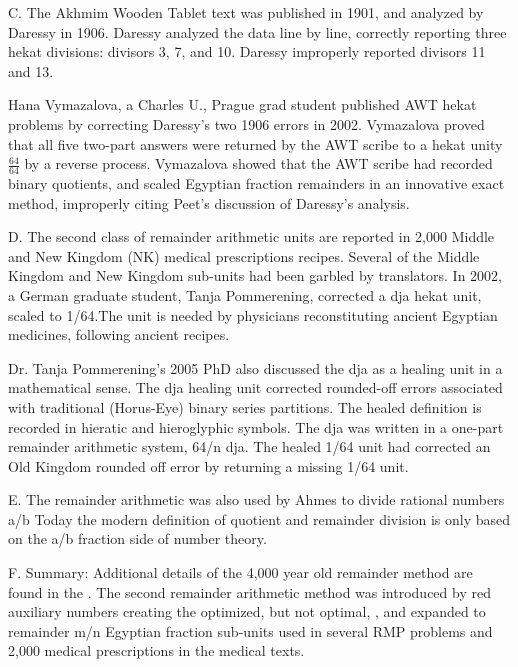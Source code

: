 \documentclass[12pt]{article}
\begin{document}
C. The Akhmim Wooden Tablet text was published in 1901, and analyzed by Daressy in 1906. Daressy analyzed the data line by line, correctly reporting three hekat divisions: divisors 3, 7, and 10. Daressy improperly reported divisors 11 and 13.

Hana Vymazalova, a Charles U., Prague grad student published AWT hekat problems by correcting Daressy's two 1906 errors in 2002. Vymazalova proved that all five two-part answers were returned by the AWT scribe to a hekat unity $\frac{64}{64}$ by a reverse process. Vymazalova showed that the AWT scribe had recorded binary quotients, and scaled Egyptian fraction remainders in an innovative exact method, improperly citing Peet's discussion of Daressy's analysis.

D. The second class of remainder arithmetic units are reported in 2,000 Middle and New Kingdom (NK) medical prescriptions recipes. Several of the Middle Kingdom and New Kingdom sub-units had been garbled by translators. In 2002, a German graduate student, Tanja Pommerening, corrected a dja hekat unit, scaled to 1/64.The unit is needed by physicians reconstituting ancient Egyptian medicines, following ancient recipes.

Dr. Tanja Pommerening's 2005 PhD also discussed the dja as a healing unit in a mathematical sense. The dja healing unit corrected rounded-off errors associated with traditional (Horus-Eye) binary series partitions. The healed definition is recorded in hieratic and hieroglyphic symbols. The dja was written in a one-part remainder arithmetic system, 64/n dja. The healed 1/64 unit had corrected an Old Kingdom rounded off error by returning a missing 1/64 unit.

E. The remainder arithmetic was also used by Ahmes to divide rational numbers a/b Today the modern definition of quotient and remainder division is only based on the a/b fraction side of number theory.

F. Summary: Additional details of the 4,000 year old remainder method are found in the . The second remainder arithmetic method was introduced by red auxiliary numbers creating the optimized, but not optimal, , and expanded to remainder m/n Egyptian fraction sub-units used in several RMP problems and 2,000 medical prescriptions in the medical texts.
\end{document}
